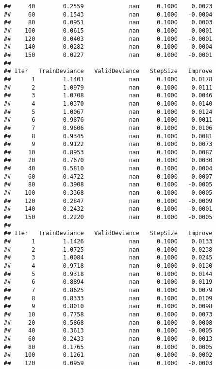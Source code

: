 \documentclass[]{article}
\begin{document}
\begin{verbatim}
##     40        0.2559             nan     0.1000    0.0023
##     60        0.1543             nan     0.1000   -0.0004
##     80        0.0951             nan     0.1000    0.0003
##    100        0.0615             nan     0.1000    0.0001
##    120        0.0403             nan     0.1000   -0.0001
##    140        0.0282             nan     0.1000   -0.0004
##    150        0.0227             nan     0.1000   -0.0001
## 
## Iter   TrainDeviance   ValidDeviance   StepSize   Improve
##      1        1.1401             nan     0.1000    0.0178
##      2        1.0979             nan     0.1000    0.0111
##      3        1.0708             nan     0.1000    0.0046
##      4        1.0370             nan     0.1000    0.0140
##      5        1.0067             nan     0.1000    0.0124
##      6        0.9876             nan     0.1000    0.0011
##      7        0.9606             nan     0.1000    0.0106
##      8        0.9345             nan     0.1000    0.0081
##      9        0.9122             nan     0.1000    0.0073
##     10        0.8953             nan     0.1000    0.0087
##     20        0.7670             nan     0.1000    0.0030
##     40        0.5810             nan     0.1000    0.0004
##     60        0.4722             nan     0.1000   -0.0007
##     80        0.3908             nan     0.1000   -0.0005
##    100        0.3368             nan     0.1000   -0.0005
##    120        0.2847             nan     0.1000   -0.0009
##    140        0.2432             nan     0.1000   -0.0001
##    150        0.2220             nan     0.1000   -0.0005
## 
## Iter   TrainDeviance   ValidDeviance   StepSize   Improve
##      1        1.1426             nan     0.1000    0.0133
##      2        1.0725             nan     0.1000    0.0238
##      3        1.0084             nan     0.1000    0.0245
##      4        0.9718             nan     0.1000    0.0130
##      5        0.9318             nan     0.1000    0.0144
##      6        0.8894             nan     0.1000    0.0119
##      7        0.8625             nan     0.1000    0.0079
##      8        0.8333             nan     0.1000    0.0109
##      9        0.8010             nan     0.1000    0.0098
##     10        0.7758             nan     0.1000    0.0073
##     20        0.5868             nan     0.1000   -0.0008
##     40        0.3613             nan     0.1000   -0.0005
##     60        0.2433             nan     0.1000   -0.0013
##     80        0.1765             nan     0.1000    0.0005
##    100        0.1261             nan     0.1000   -0.0002
##    120        0.0959             nan     0.1000   -0.0003

\end{verbatim}
\end{document}
